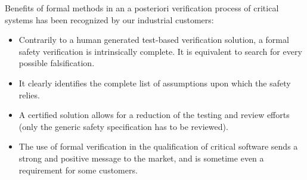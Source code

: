 Benefits of formal  methods in an a posteriori verification process of critical systems has been recognized by our industrial customers:

\begin{itemize}
\item Contrarily to a human generated test-based verification solution, a formal safety verification is
intrinsically complete. It is equivalent to search for every possible falsification.
\item It clearly identifies the complete list of assumptions upon which the safety relies.
\item A certified solution allows for a reduction of the testing and review efforts (only the generic safety
specification has to be reviewed).
\item The use of formal verification in the qualification of critical software sends a strong
and positive message to the market, and is sometime even a requirement for some customers.
\end{itemize}


